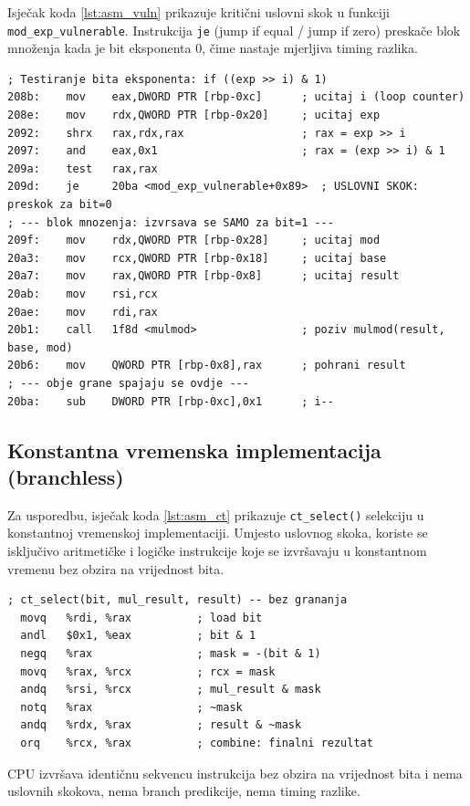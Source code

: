Isječak koda \ref{lst:asm_vuln} prikazuje kritični uslovni skok u funkciji \texttt{mod\_exp\_vulnerable}. Instrukcija \texttt{je} (jump if equal / jump if zero) preskače blok množenja kada je bit eksponenta 0, čime nastaje mjerljiva timing razlika.

\begin{lstlisting}[caption={Ključni uslovni skok (\textit{branch}) u \texttt{mod\_exp\_vulnerable} -- stvarni \texttt{objdump} izlaz (GCC 13.3, \texttt{-O0}, Intel sintaksa)}, label=lst:asm_vuln, basicstyle=\ttfamily\small, numbers=none]
; Testiranje bita eksponenta: if ((exp >> i) & 1)
208b:    mov    eax,DWORD PTR [rbp-0xc]      ; ucitaj i (loop counter)
208e:    mov    rdx,QWORD PTR [rbp-0x20]     ; ucitaj exp
2092:    shrx   rax,rdx,rax                  ; rax = exp >> i
2097:    and    eax,0x1                      ; rax = (exp >> i) & 1
209a:    test   rax,rax
209d:    je     20ba <mod_exp_vulnerable+0x89>  ; USLOVNI SKOK: preskok za bit=0
; --- blok mnozenja: izvrsava se SAMO za bit=1 ---
209f:    mov    rdx,QWORD PTR [rbp-0x28]     ; ucitaj mod
20a3:    mov    rcx,QWORD PTR [rbp-0x18]     ; ucitaj base
20a7:    mov    rax,QWORD PTR [rbp-0x8]      ; ucitaj result
20ab:    mov    rsi,rcx
20ae:    mov    rdi,rax
20b1:    call   1f8d <mulmod>                ; poziv mulmod(result, base, mod)
20b6:    mov    QWORD PTR [rbp-0x8],rax      ; pohrani result
; --- obje grane spajaju se ovdje ---
20ba:    sub    DWORD PTR [rbp-0xc],0x1      ; i--
\end{lstlisting}

\subsection{Konstantna vremenska implementacija (branchless)}

Za usporedbu, isječak koda \ref{lst:asm_ct} prikazuje \texttt{ct\_select()} selekciju u konstantnoj vremenskoj implementaciji. Umjesto uslovnog skoka, koriste se isključivo aritmetičke i logičke instrukcije koje se izvršavaju u konstantnom vremenu bez obzira na vrijednost bita.

\begin{lstlisting}[caption={Selekcija bez grananja (\textit{branchless}) u \texttt{mod\_exp\_constant\_time}}, label=lst:asm_ct, basicstyle=\ttfamily\small, numbers=none]
  ; ct_select(bit, mul_result, result) -- bez grananja
  movq   %rdi, %rax          ; load bit
  andl   $0x1, %eax          ; bit & 1
  negq   %rax                ; mask = -(bit & 1)
  movq   %rax, %rcx          ; rcx = mask
  andq   %rsi, %rcx          ; mul_result & mask
  notq   %rax                ; ~mask
  andq   %rdx, %rax          ; result & ~mask
  orq    %rcx, %rax          ; combine: finalni rezultat
\end{lstlisting}

\noindent CPU izvršava identičnu sekvencu instrukcija bez obzira na vrijednost bita i nema uslovnih skokova, nema branch predikcije, nema timing razlike.
